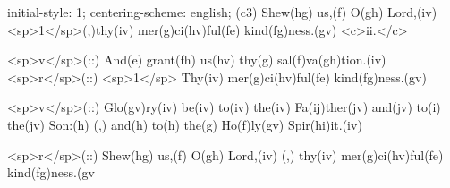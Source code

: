 initial-style: 1;
centering-scheme: english;
(c3) Shew(hg) us,(f) O(gh) Lord,(iv) <sp>1</sp>(,)thy(iv) mer(g)ci(hv)ful(fe) kind(fg)ness.(gv) <c>ii.</c>

<sp>v</sp>(::) And(e) grant(fh) us(hv) thy(g) sal(f)va(gh)tion.(iv) <sp>r</sp>(::) <sp>1</sp> Thy(iv) mer(g)ci(hv)ful(fe) kind(fg)ness.(gv)

<sp>v</sp>(::) Glo(gv)ry(iv) be(iv) to(iv) the(iv) Fa(ij)ther(jv) and(jv) to(i) the(jv) Son:(h) (,) and(h) to(h) the(g) Ho(f)ly(gv) Spir(hi)it.(iv)

<sp>r</sp>(::)  Shew(hg) us,(f) O(gh) Lord,(iv) (,) thy(iv) mer(g)ci(hv)ful(fe) kind(fg)ness.(gv